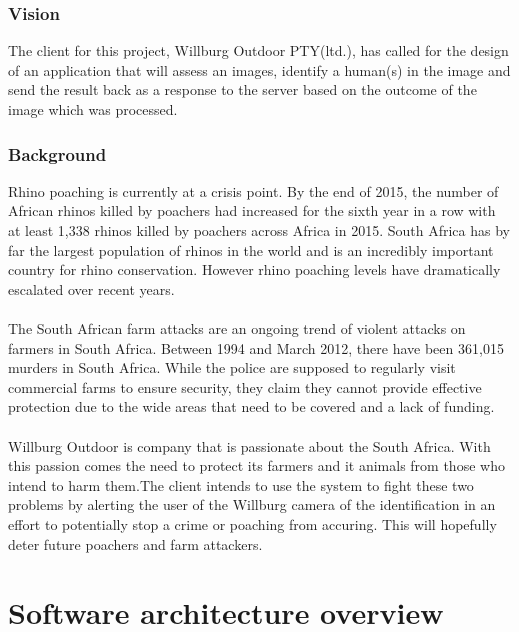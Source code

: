 \documentclass[a4paper,12pt]{report}
\begin{document}
 \subsubsection{Vision}
 The client for this project, Willburg Outdoor PTY(ltd.), has called for the design of an application that will assess an images, identify a human(s) in the image and send the result back as a response to the server based on the outcome of the image which was processed.

\subsubsection{Background}
Rhino poaching is currently at a crisis point. By the end of 2015, the number of African rhinos killed by poachers had increased for the sixth year in a row with at least 1,338 rhinos killed by poachers across Africa in 2015. South Africa has by far the largest population of rhinos in the world and is an incredibly important country for rhino conservation. However rhino poaching levels have dramatically escalated over recent years. \\
\\The South African farm attacks are an ongoing trend of violent attacks on farmers in South Africa. Between 1994 and March 2012, there have been 361,015 murders in South Africa. While the police are supposed to regularly visit commercial farms to ensure security, they claim they cannot provide effective protection due to the wide areas that need to be covered and a lack of funding.\\
\\Willburg Outdoor is company that is passionate about the South Africa. With this passion comes the need to protect its farmers and it animals from those who intend to harm them.The client intends to use the system to fight these two problems by alerting the user of the Willburg camera of the identification in an effort to potentially stop a crime or poaching from accuring. This will hopefully deter future poachers and farm attackers.

\section {Software architecture overview}
\end{document}
